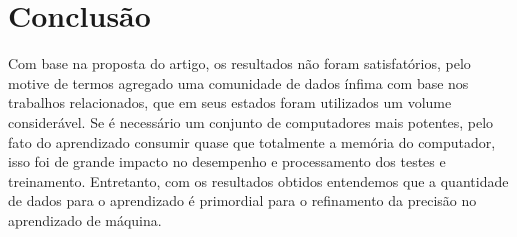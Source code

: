 \documentclass[12pt]{article}
\begin{document}
	\section{Conclusão}
		Com base na proposta do artigo, os resultados não foram satisfatórios, pelo motive de termos agregado uma comunidade de dados ínfima com base nos trabalhos relacionados, que em seus estados foram utilizados um volume considerável. Se é necessário um conjunto de computadores mais potentes, pelo fato do aprendizado consumir quase que totalmente a memória do computador, isso foi de grande impacto no desempenho e processamento dos testes e treinamento. Entretanto, com os resultados obtidos entendemos que a quantidade de dados para o aprendizado é primordial para o refinamento da precisão no aprendizado de máquina.

	
		
\end{document}
